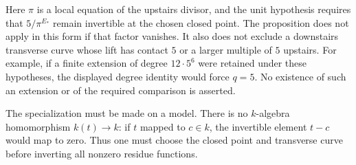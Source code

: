 Here $\pi$ is a local equation of the upstairs divisor, and the unit
hypothesis requires that $5/\pi^{E_*}$ remain invertible at the chosen
closed point.  The proposition does not apply in this form if that
factor vanishes.  It also does not exclude a downstairs transverse
curve whose lift has contact $5$ or a larger multiple of $5$ upstairs.
For example, if a finite extension of degree $12\cdot5^6$ were retained
under these hypotheses, the displayed degree identity would force
$q=5$.  No existence of such an extension or of the required comparison
is asserted.

The specialization must be made on a model.  There is no $k$-algebra
homomorphism $k(t)\to k$: if $t$ mapped to $c\in k$, the invertible
element $t-c$ would map to zero.  Thus one must choose the closed point
and transverse curve before inverting all nonzero residue functions.

